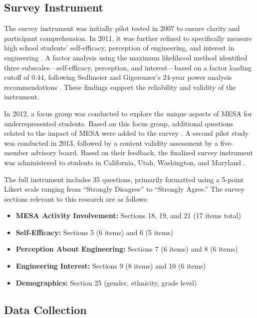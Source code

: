 \documentclass[11pt]{article}
\begin{document}
\subsection{Survey Instrument}

The survey instrument was initially pilot tested in 2007 to ensure clarity and participant comprehension. In 2011, it was further refined to specifically measure high school students’ self-efficacy, perception of engineering, and interest in engineering \cite{hailey2011}. A factor analysis using the maximum likelihood method identified three subscales—self-efficacy, perception, and interest—based on a factor loading cutoff of 0.44, following Sedlmeier and Gigerenzer’s 24-year power analysis recommendations \cite{sedlmeier1989}. These findings support the reliability and validity of the instrument.

In 2012, a focus group was conducted to explore the unique aspects of MESA for underrepresented students. Based on this focus group, additional questions related to the impact of MESA were added to the survey \cite{denson2012}. A second pilot study was conducted in 2013, followed by a content validity assessment by a five-member advisory board. Based on their feedback, the finalized survey instrument was administered to students in California, Utah, Washington, and Maryland \cite{hailey2013}.

The full instrument includes 35 questions, primarily formatted using a 5-point Likert scale ranging from ``Strongly Disagree'' to ``Strongly Agree.'' The survey sections relevant to this research are as follows:

\begin{itemize}
    \item \textbf{MESA Activity Involvement:} Sections 18, 19, and 21 (17 items total)
    \item \textbf{Self-Efficacy:} Sections 5 (6 items) and 6 (5 items)
    \item \textbf{Perception About Engineering:} Sections 7 (6 items) and 8 (6 items)
    \item \textbf{Engineering Interest:} Sections 9 (8 items) and 10 (6 items)
    \item \textbf{Demographics:} Section 25 (gender, ethnicity, grade level)
\end{itemize}

\subsection{Data Collection}
\end{document}
